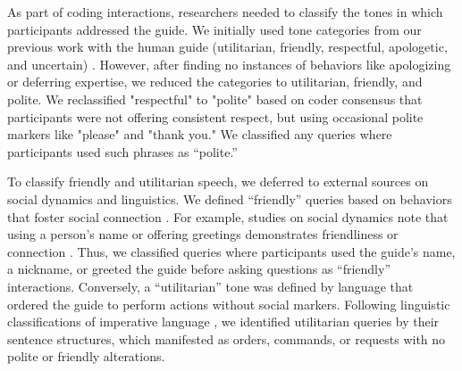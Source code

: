 As part of coding interactions, researchers needed to classify the tones in which participants addressed the guide. We initially used tone categories from our previous work with the human guide (utilitarian, friendly, respectful, apologetic, and uncertain) \cite{collins2023guide}. However, after finding no instances of behaviors like apologizing or deferring expertise, we reduced the categories to utilitarian, friendly, and polite. We reclassified "respectful" to "polite" based on coder consensus that participants were not offering consistent respect, but using occasional polite markers like "please" and "thank you." We classified any queries where participants used such phrases as “polite.”

To classify friendly and utilitarian speech, we deferred to external sources on social dynamics and linguistics. We defined “friendly” queries based on behaviors that foster social connection \cite{angelo2015, goodwin1990}. For example, studies on social dynamics note that using a person's name or offering greetings demonstrates friendliness or connection \cite{angelo2015, goodwin1990}. Thus, we classified queries where participants used the guide’s name, a nickname, or greeted the guide before asking questions as “friendly” interactions. Conversely, a “utilitarian” tone was defined by language that ordered the guide to perform actions without social markers. Following linguistic classifications of imperative language \cite{kaufmann2011}, we identified utilitarian queries by their sentence structures, which manifested as orders, commands, or requests with no polite or friendly alterations.